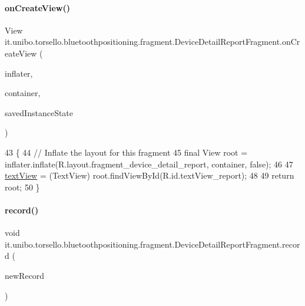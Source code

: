 \paragraph{\texorpdfstring{on\+Create\+View()}{onCreateView()}}
{\footnotesize\ttfamily View it.\+unibo.\+torsello.\+bluetoothpositioning.\+fragment.\+Device\+Detail\+Report\+Fragment.\+on\+Create\+View (\begin{DoxyParamCaption}\item[{Layout\+Inflater}]{inflater,  }\item[{View\+Group}]{container,  }\item[{Bundle}]{saved\+Instance\+State }\end{DoxyParamCaption})}


\begin{DoxyCode}
43                                                         \{
44         \textcolor{comment}{// Inflate the layout for this fragment}
45         \textcolor{keyword}{final} View root = inflater.inflate(R.layout.fragment\_device\_detail\_report, container, \textcolor{keyword}{false});
46 
47         \hyperlink{classit_1_1unibo_1_1torsello_1_1bluetoothpositioning_1_1fragment_1_1DeviceDetailReportFragment_a6f00cf8dad82dcd8d6371db58c2235cf_a6f00cf8dad82dcd8d6371db58c2235cf}{textView} = (TextView) root.findViewById(R.id.textView\_report);
48 
49         \textcolor{keywordflow}{return} root;
50     \}
\end{DoxyCode}
\hypertarget{classit_1_1unibo_1_1torsello_1_1bluetoothpositioning_1_1fragment_1_1DeviceDetailReportFragment_ae9615d2a2096700befd416d0d8a95f85_ae9615d2a2096700befd416d0d8a95f85}{}\label{classit_1_1unibo_1_1torsello_1_1bluetoothpositioning_1_1fragment_1_1DeviceDetailReportFragment_ae9615d2a2096700befd416d0d8a95f85_ae9615d2a2096700befd416d0d8a95f85} 
\paragraph{\texorpdfstring{record()}{record()}}
{\footnotesize\ttfamily void it.\+unibo.\+torsello.\+bluetoothpositioning.\+fragment.\+Device\+Detail\+Report\+Fragment.\+record (\begin{DoxyParamCaption}\item[{String}]{new\+Record }\end{DoxyParamCaption})}



